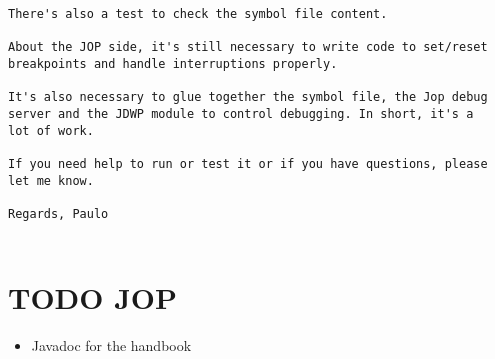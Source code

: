 \begin{verbatim}
There's also a test to check the symbol file content.

About the JOP side, it's still necessary to write code to set/reset
breakpoints and handle interruptions properly.

It's also necessary to glue together the symbol file, the Jop debug
server and the JDWP module to control debugging. In short, it's a
lot of work.

If you need help to run or test it or if you have questions, please
let me know.

Regards, Paulo


\end{verbatim}


\section{TODO JOP}

\begin{itemize}
    \item Javadoc for the handbook
\end{itemize}
